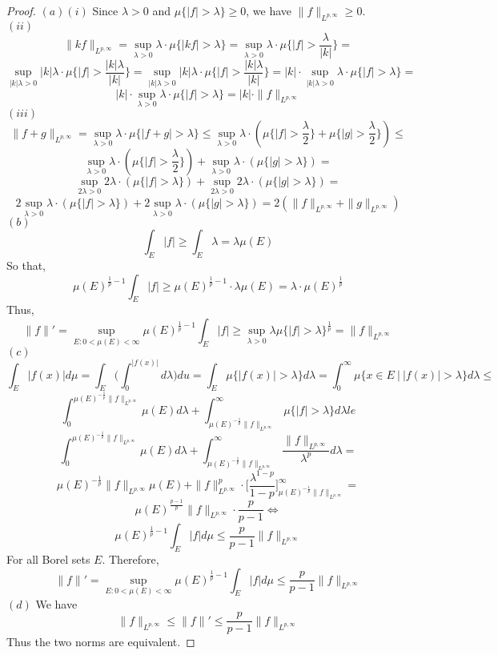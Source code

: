 \documentclass[12pt]{article}
\begin{document}
\begin{proof}
  $(a) (i)$ Since $\lambda > 0$ and $\mu\{|f| > \lambda\} \ge 0$, we have $\|f\|_{L^{p, \infty}}\ge 0$.\\
  $(ii)$
  $$\|kf\|_{L^{p, \infty}} = \sup_{\lambda > 0} \lambda \cdot \mu\{|kf| > \lambda\} = \sup_{\lambda > 0} \lambda \cdot \mu\{|f| > \frac{\lambda}{|k|}\} =$$
  $$\sup_{|k|\lambda > 0} |k|\lambda \cdot \mu\{|f| > \frac{|k|\lambda}{|k|}\} = \sup_{|k|\lambda > 0} |k|\lambda \cdot \mu\{|f| > \frac{|k|\lambda}{|k|}\} =
  |k| \cdot \sup_{|k|\lambda > 0} \lambda \cdot \mu\{|f| > \lambda\} =$$
  $$|k| \cdot \sup_{\lambda > 0} \lambda \cdot \mu\{|f| > \lambda\} = |k| \cdot \|f\|_{L^{p, \infty}}$$
  $(iii)$
  $$\|f + g\|_{L^{p, \infty}} = \sup_{\lambda > 0} \lambda \cdot \mu\{|f + g| > \lambda\} \le \sup_{\lambda > 0} \lambda \cdot (\mu\{|f| > \frac{\lambda}{2}\} + \mu\{|g| > \frac{\lambda}{2}\}) \le$$
  $$\sup_{\lambda > 0} \lambda \cdot (\mu\{|f| > \frac{\lambda}{2}\}) + \sup_{\lambda > 0} \lambda \cdot (\mu\{|g| > \lambda\}) =$$
  $$\sup_{2\lambda > 0} 2\lambda \cdot (\mu\{|f| > \lambda\}) + \sup_{2\lambda > 0} 2\lambda \cdot (\mu\{|g| > \lambda\}) =$$
  $$2\sup_{\lambda > 0} \lambda \cdot (\mu\{|f| > \lambda\}) + 2\sup_{\lambda > 0} \lambda \cdot (\mu\{|g| > \lambda\}) = 2 (\|f\|_{L^{p, \infty}} + \|g\|_{L^{p, \infty}})$$
  $(b)$
  $$\int_E |f| \ge \int_E \lambda = \lambda \mu(E)$$
  So that,
  $$\mu(E)^{\frac{1}{p}-1} \int_E |f| \ge \mu(E)^{\frac{1}{p}-1} \cdot \lambda \mu(E) = \lambda \cdot \mu(E)^{\frac{1}{p}}$$
  Thus,
  $$\|f\|' = \sup_{E: 0 < \mu(E) < \infty} \mu(E)^{\frac{1}{p}-1} \int_E |f| \ge \sup_{\lambda > 0} \lambda \mu\{|f| > \lambda\}^{\frac{1}{p}} = \|f\|_{L^{p, \infty}}$$
  $(c)$
  $$\int_E |f(x)| d\mu = \int_E \Big(\int_0^{|f(x)|} d\lambda \Big) du = \int_E \mu\{|f(x)| > \lambda\} d\lambda = \int_0^{\infty} \mu\{x \in E\ |\ |f(x)| > \lambda\} d\lambda \le$$
  $$\int_0^{\mu(E)^{-\frac{1}{p}}\|f\|_{L^{p, \infty}}} \mu(E) d\lambda + \int_{\mu(E)^{-\frac{1}{p}}\|f\|_{L^{p, \infty}}}^{\infty} \mu\{|f| > \lambda\} d\lambda le$$
  $$\int_0^{\mu(E)^{-\frac{1}{p}}\|f\|_{L^{p, \infty}}} \mu(E) d\lambda + \int_{\mu(E)^{-\frac{1}{p}}\|f\|_{L^{p, \infty}}}^{\infty} \dfrac{\|f\|_{L^{p, \infty}}}{\lambda^p} d\lambda = $$
  $$\mu(E)^{-\frac{1}{p}}\|f\|_{L^{p, \infty}}\mu(E) + \|f\|_{L^{p, \infty}}^p \cdot \Big[\dfrac{\lambda^{1-p}}{1-p}\Big]_{\mu(E)^{-\frac{1}{p}}\|f\|_{L^{p, \infty}}}^{\infty} =$$
  $$\mu(E)^{\frac{p-1}{p}} \|f\|_{L^{p, \infty}} \cdot \dfrac{p}{p-1} \iff$$
  $$\mu(E)^{\frac{1}{p} - 1} \int_E |f| d\mu \le \dfrac{p}{p-1} \|f\|_{L^{p, \infty}}$$
  For all Borel sets $E$. Therefore,
  $$\|f\|' = \sup_{E: 0 < \mu(E) < \infty} \mu(E)^{\frac{1}{p} - 1} \int_E |f| d\mu \le \dfrac{p}{p-1} \|f\|_{L^{p, \infty}}$$
  $(d)$ We have
  $$\|f\|_{L^{p, \infty}} \le \|f\|' \le \dfrac{p}{p-1} \|f\|_{L^{p, \infty}}$$
  Thus the two norms are equivalent.
\end{proof}
\end{document}
